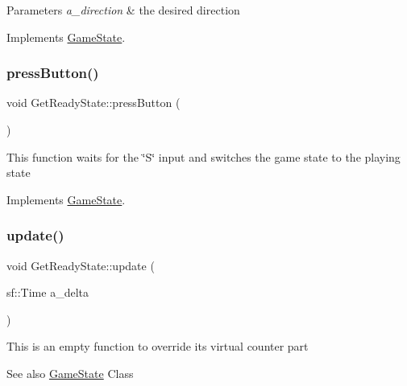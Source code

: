\begin{DoxyParams}{Parameters}
{\em a\+\_\+direction} & the desired direction \\
\hline
\end{DoxyParams}


Implements \hyperlink{class_game_state_aaae8c1b3ae6969eb2dd81bfc12fbf43f}{Game\+State}.

\mbox{\label{class_get_ready_state_a414a505ec783b1bf577b1b859abaee46}} 
\subsubsection{\texorpdfstring{press\+Button()}{pressButton()}}
{\footnotesize\ttfamily void Get\+Ready\+State\+::press\+Button (\begin{DoxyParamCaption}{ }\end{DoxyParamCaption})\hspace{0.3cm}{\ttfamily [virtual]}}

This function waits for the \char`\"{}\+S\char`\"{} input and switches the game state to the playing state 

Implements \hyperlink{class_game_state_aa14eeaf244bcf19b7013af75cb722dde}{Game\+State}.

\mbox{\label{class_get_ready_state_a6e5a1035b4ee7a52aa28027a0b99dd8a}} 
\subsubsection{\texorpdfstring{update()}{update()}}
{\footnotesize\ttfamily void Get\+Ready\+State\+::update (\begin{DoxyParamCaption}\item[{sf\+::\+Time}]{a\+\_\+delta }\end{DoxyParamCaption})\hspace{0.3cm}{\ttfamily [virtual]}}

This is an empty function to override it\textquotesingle{}s virtual counter part \begin{DoxySeeAlso}{See also}
\hyperlink{class_game_state}{Game\+State} Class 
\end{DoxySeeAlso}

